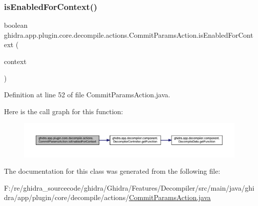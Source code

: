 \subsubsection{\texorpdfstring{isEnabledForContext()}{isEnabledForContext()}}
{\footnotesize\ttfamily boolean ghidra.\+app.\+plugin.\+core.\+decompile.\+actions.\+Commit\+Params\+Action.\+is\+Enabled\+For\+Context (\begin{DoxyParamCaption}\item[{Action\+Context}]{context }\end{DoxyParamCaption})\hspace{0.3cm}{\ttfamily [inline]}}



Definition at line 52 of file Commit\+Params\+Action.\+java.

Here is the call graph for this function\+:
\nopagebreak
\begin{figure}[H]
\begin{center}
\leavevmode
\includegraphics[width=350pt]{classghidra_1_1app_1_1plugin_1_1core_1_1decompile_1_1actions_1_1_commit_params_action_ae5850c15b5241ba5c27bfec0f8ae6485_cgraph}
\end{center}
\end{figure}


The documentation for this class was generated from the following file\+:\begin{DoxyCompactItemize}
\item 
F\+:/re/ghidra\+\_\+sourcecode/ghidra/\+Ghidra/\+Features/\+Decompiler/src/main/java/ghidra/app/plugin/core/decompile/actions/\mbox{\hyperlink{_commit_params_action_8java}{Commit\+Params\+Action.\+java}}\end{DoxyCompactItemize}
